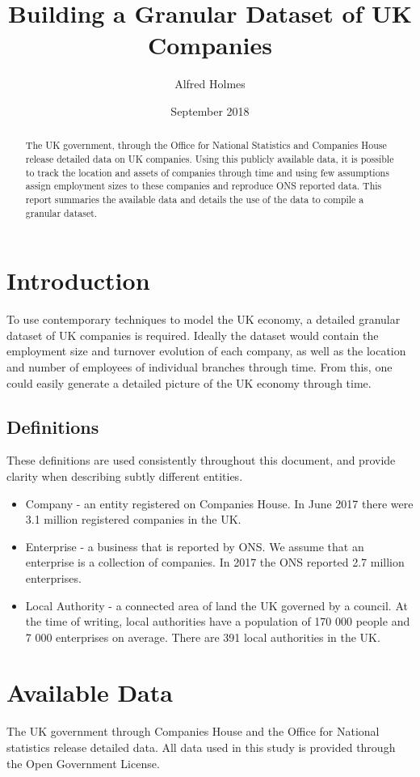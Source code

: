 \documentclass[a4paper,10pt]{article}
\title{Building a Granular Dataset of UK Companies}
\author{Alfred Holmes}
\date{September 2018}
\begin{document}
   \maketitle
   \begin{abstract}
   The UK government, through the Office for National Statistics and Companies House release detailed data on UK companies. Using this publicly available data, it is possible to track the location and assets of companies through time and using few assumptions assign employment sizes to these companies and reproduce ONS reported data. This report summaries the available data and details the use of the data to compile a granular dataset.
   \end{abstract}
   \section{Introduction}
   To use contemporary techniques to model the UK economy, a detailed granular dataset of UK companies is required. Ideally the dataset would contain the employment size and turnover evolution of each company, as well as the location and number of employees of individual branches through time. From this, one could easily generate a detailed picture of the UK economy through time.
   \subsection{Definitions}
   These definitions are used consistently throughout this document, and provide clarity when describing subtly different entities.
   \begin{itemize}
 	\item Company - an entity registered on Companies House. In June 2017 there were 3.1 million registered companies in the UK. 
 	\item Enterprise - a business that is reported by ONS. We assume that an enterprise is a collection of companies. In 2017 the ONS reported 2.7 million enterprises.
 	\item Local Authority - a connected area of land the UK governed by a council. At the time of writing, local authorities have a population of 170 000 people and 7 000 enterprises on average. There are 391 local authorities in the UK.
   \end{itemize}

   \section{Available Data}
   The UK government through Companies House and the Office for National statistics release detailed data. All data used in this study is provided through the Open Government License.
\end{document}
